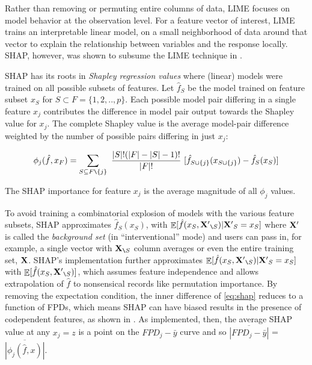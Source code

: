 \documentclass[11pt]{article}
\renewcommand{\slash}{\texttt{\char`\\}}
\DeclareMathOperator{\Ex}{\mathbb{E}}
\begin{document}
Rather than removing or permuting entire columns of data, LIME \citep{lime} focuses on model behavior at the observation level. For a feature vector of interest, LIME trains an interpretable linear model, on a small neighborhood of data around that vector to explain the relationship between variables and the response locally. SHAP, however, was shown to subsume the LIME technique in \citep{shap}. 

SHAP has its roots in {\em Shapley regression values} \citep{shapley-regression} where (linear) models were trained on all possible subsets of features. Let $\hat{f}_S$ be the model trained on feature subset $x_S$ for $S \subset F = \{1, 2, .., p\}$. Each possible model pair differing in a single feature $x_j$ contributes the difference in model pair output towards the Shapley value for $x_j$. The complete Shapley value is the average model-pair difference weighted by the number of possible pairs differing in just $x_j$:
\vspace{-1mm}

\begin{equation}\label{eq:shap}
\phi_j(\hat{f},x_F) = \sum_{S \subseteq F \slash \{j\}}\
\frac{|S|!(|F|-|S|-1)!}{|F|!}\
 [ \hat{f}_{S \cup \{j\}}(x_{S \cup \{j\}}) - \hat{f}_S(x_S) ]
\end{equation}\vspace{-1mm}

\noindent The SHAP importance for feature $x_j$ is the average magnitude of all $\phi_j$ values.  

To avoid training a combinatorial explosion of models with the various feature subsets, SHAP approximates $\hat{f}_S(x_S)$, with $\Ex[\hat{f}(x_{S},{\bf X'}_{\slash S}) | {\bf X'}_S = x_S]$ where ${\bf X'}$ is called the {\em background set} (in ``interventional'' mode) and users can pass in, for example, a single vector with ${\bf X}_{\slash S}$ column averages or even the entire training set, $\bf X$.  SHAP's implementation further approximates $\Ex[\hat{f}(x_{S},{\bf X'}_{\slash S}) | {\bf X'}_S = x_S]$ with $\Ex[\hat{f}(x_{S},{\bf X'}_{\slash S})]$, which assumes feature independence and allows extrapolation of $\hat{f}$ to nonsensical records like permutation importance. By removing the expectation condition, the inner difference of \eqref{eq:shap} reduces to a function of FPDs, which means SHAP can have biased results in the presence of codependent features, as shown in \cite{stratpd}.  As implemented, then, the average SHAP value at any $x_j = z$ is a point on the $FPD_j - \bar{y}$ curve and so $\overline{|FPD_j-\bar{y}|}$ = $\overline{|\phi_j(\hat{f},x)|}$. 
\end{document}
